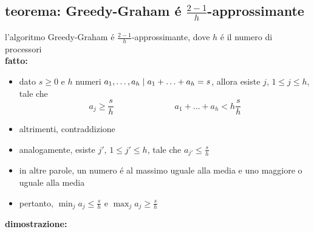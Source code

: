 \subsection*{teorema: Greedy-Graham \'e $\frac{2-1}{h}$-approssimante}
\begin{flushleft}
	l'algoritmo Greedy-Graham \'e $\frac{2-1}{h}$-approssimante, dove $h$ \'e il numero di processori \newline \\
	\vspace{0.5cm}
	\textbf{fatto:}
	\begin{itemize}
		\item dato $s\geq 0$ e $h$ numeri $a_1,\ldots,a_h\hspace{0.1cm}\vert\hspace{0.1cm}a_1+\ldots+a_h=s$, allora esiste $j$, $1\leq j\leq h$, tale che \newline
			$$a_j\geq\frac{s}{h}\hspace{3cm}a_1+\ldots+a_h<h\frac{s}{h}$$
		\item altrimenti, contraddizione
		\item analogamente, esiste $j'$, $1\leq j'\leq h$, tale che $a_{j'}\leq\frac{s}{h}$
		\item in altre parole, un numero \'e al massimo uguale alla media e uno maggiore o uguale alla media
		\item pertanto, $\min_j a_j\leq\frac{s}{h}$ e $\max_j a_j\geq\frac{s}{h}$
	\end{itemize}
	\vspace{0.5cm}
	\textbf{dimostrazione:}
\end{flushleft}


\subsection*{}
\begin{flushleft}
\end{flushleft}


\subsection*{}
\begin{flushleft}
\end{flushleft}

